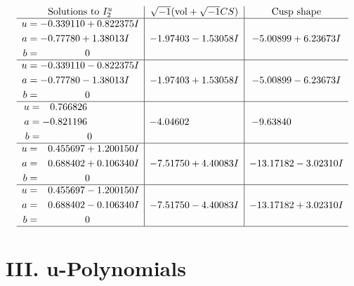 \documentclass[1p]{elsarticle_modified}
\theoremstyle{definition}
\newcommand{\I}{\sqrt{-1}}
\begin{document}
$$\begin{array}{c|c|c}  
\text{Solutions to }I^u_{2}& \I (\text{vol} + \sqrt{-1}CS) & \text{Cusp shape}\\
 \hline 
\begin{aligned}
u &= -0.339110 + 0.822375 I \\
a &= -0.77780 + 1.38013 I \\
b &= \phantom{-0.000000 } 0\end{aligned}
 & -1.97403 - 1.53058 I & -5.00899 + 6.23673 I \\ \hline\begin{aligned}
u &= -0.339110 - 0.822375 I \\
a &= -0.77780 - 1.38013 I \\
b &= \phantom{-0.000000 } 0\end{aligned}
 & -1.97403 + 1.53058 I & -5.00899 - 6.23673 I \\ \hline\begin{aligned}
u &= \phantom{-}0.766826\phantom{ +0.000000I} \\
a &= -0.821196\phantom{ +0.000000I} \\
b &= \phantom{-0.000000 } 0\end{aligned}
 & -4.04602\phantom{ +0.000000I} & -9.63840\phantom{ +0.000000I} \\ \hline\begin{aligned}
u &= \phantom{-}0.455697 + 1.200150 I \\
a &= \phantom{-}0.688402 + 0.106340 I \\
b &= \phantom{-0.000000 } 0\end{aligned}
 & -7.51750 + 4.40083 I & -13.17182 - 3.02310 I \\ \hline\begin{aligned}
u &= \phantom{-}0.455697 - 1.200150 I \\
a &= \phantom{-}0.688402 - 0.106340 I \\
b &= \phantom{-0.000000 } 0\end{aligned}
 & -7.51750 - 4.40083 I & -13.17182 + 3.02310 I\\
 \hline 
 \end{array}$$\newpage
\newpage\renewcommand{\arraystretch}{1}
\centering \section*{ III. u-Polynomials}
\end{document}
